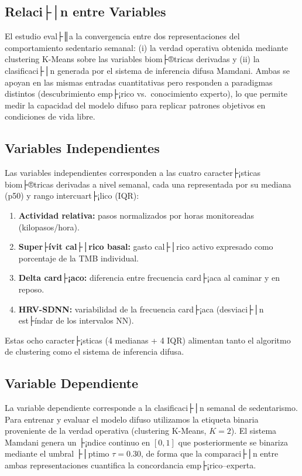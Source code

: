 \subsection{Relaci├│n entre Variables}
\label{subsec:relacion_variables}

El estudio eval├║a la convergencia entre dos representaciones del comportamiento sedentario semanal: (i) la verdad operativa obtenida mediante clustering K-Means sobre las variables biom├®tricas derivadas y (ii) la clasificaci├│n generada por el sistema de inferencia difusa Mamdani. Ambas se apoyan en las mismas entradas cuantitativas pero responden a paradigmas distintos (descubrimiento emp├¡rico vs.\ conocimiento experto), lo que permite medir la capacidad del modelo difuso para replicar patrones objetivos en condiciones de vida libre.

\subsection{Variables Independientes}
\label{subsec:variables_independientes}

Las variables independientes corresponden a las cuatro caracter├¡sticas biom├®tricas derivadas a nivel semanal, cada una representada por su mediana (p50) y rango intercuart├¡lico (IQR):
\begin{enumerate}[noitemsep]
    \item \textbf{Actividad relativa:} pasos normalizados por horas monitoreadas (kilopasos/hora).
    \item \textbf{Super├ívit cal├│rico basal:} gasto cal├│rico activo expresado como porcentaje de la TMB individual.
    \item \textbf{Delta card├¡aco:} diferencia entre frecuencia card├¡aca al caminar y en reposo.
    \item \textbf{HRV-SDNN:} variabilidad de la frecuencia card├¡aca (desviaci├│n est├índar de los intervalos NN).
\end{enumerate}
Estas ocho caracter├¡sticas (4 medianas + 4 IQR) alimentan tanto el algoritmo de clustering como el sistema de inferencia difusa.

\subsection{Variable Dependiente}
\label{subsec:variable_dependiente}

La variable dependiente corresponde a la clasificaci├│n semanal de sedentarismo. Para entrenar y evaluar el modelo difuso utilizamos la etiqueta binaria proveniente de la verdad operativa (clustering K-Means, $K=2$). El sistema Mamdani genera un ├¡ndice continuo en $[0,1]$ que posteriormente se binariza mediante el umbral ├│ptimo $\tau=0.30$, de forma que la comparaci├│n entre ambas representaciones cuantifica la concordancia emp├¡rico--experta.

